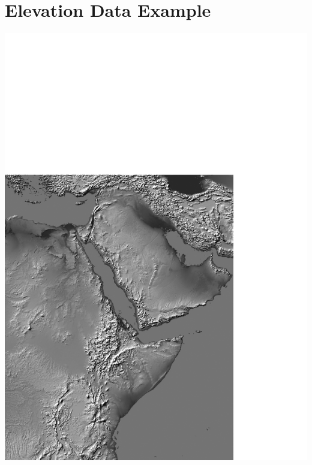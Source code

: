 \documentclass[12pt]{article}
\begin{document}
	\section{Elevation Data Example}
		\vspace{-9cm}
		\includegraphics[scale=1.0]{figures/data.png}
\end{document}
